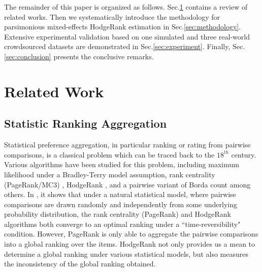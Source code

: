 \documentclass[10pt,journal,cspaper,compsoc]{IEEEtran}
\begin{document}
The remainder of this paper is organized as follows. Sec.\ref{sec:relatedwork} contains a review of related works. Then we systematically introduce the methodology for parsimonious mixed-effects HodgeRank estimation in Sec.\ref{sec:methodology}. Extensive experimental validation based on one simulated and three real-world crowdsourced datasets are demonstrated in Sec.\ref{sec:experiment}. Finally, Sec.\ref{sec:conclusion} presents the conclusive remarks.


\section{Related Work} \label{sec:relatedwork}

\subsection{Statistic Ranking Aggregation}

Statistical preference aggregation, in particular ranking or rating from pairwise comparisons,
is a classical problem which can be traced back to the $18^{th}$ century.
Various algorithms have been studied for this problem, including maximum
likelihood under a Bradley-Terry model
assumption, rank centrality (PageRank/MC3) \cite{negahban2012,dwork2001rank}, HodgeRank \cite{Hodge}
, and a pairwise variant of Borda
count \cite{de1781memoire} among others. In \cite{ICML14}, it shows that under a natural statistical model, where pairwise comparisons
are drawn randomly and independently from some
underlying probability distribution, the rank centrality (PageRank) and
HodgeRank algorithms both converge to an optimal ranking under
a ``time-reversibility" condition. However, PageRank is only able to aggregate the pairwise comparisons
into a global ranking over the items. HodgeRank not only provides us a mean to determine a global ranking under
various statistical models, but also measures the inconsistency of the global ranking obtained.
\end{document}
